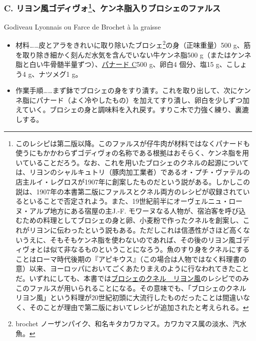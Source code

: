 \begin{recette}
{\subsubsection[C.
リヨン風ゴディヴォ、ケンネ脂入りブロシェのファルス]{\texorpdfstring{C.
リヨン風ゴディヴォ\footnote{このレシピは第二版以降。このファルスが仔牛肉が材料ではなくパナードも使うにもかかわらずゴディヴォの名称である根拠はおそらく、ケンネ脂を用いていることだろう。なお、これを用いたブロシェのクネルの起源については、リヨンのシャルキュトリ（豚肉加工業者）であるオ・プチ・ヴァテルの店主ルイ・レグロスが1907年に創案したものだという説がある。しかしこの説は、1907年の本書第二版にファルスとクネル両方のレシピが収録されているといることで否定されよう。また、19世紀前半にオーヴェルニュ・ローヌ・アルプ地方にある宿屋の主J.-F.
  モワーヌなる人物が、宿泊客を呼び込むための料理としてブロシェの身と卵、小麦粉で作ったクネルを創案し、これがリヨンに伝わったという説もある。ただしこれは信憑性がさほど高くないうえに、そもそもケンネ脂を使わないのであれば、その後のリヨン風ゴディヴォとは似て非なるものということになろう。魚のすり身をクネルにすることはローマ時代後期の『アピキウス』（この場合は人物ではなく料理書の意）以来、ヨーロッパにおいてごくあたりまえのように行なわれてきたことだ。いずれにしても、本書では\protect\hyperlink{quenelles-de-brochet-lyonnaise}{ブロシェのクネル　リヨン風}のレシピでのみこのファルスが用いられることになる。その意味でも、「ブロシェのクネル　リヨン風」という料理が20世紀初頭に大流行したものだったことは間違いなく、そのことが理由で第二版においてレシピが追加されたと考えられる。}、ケンネ脂入りブロシェのファルス}{C. リヨン風ゴディヴォ、ケンネ脂入りブロシェのファルス}}\label{godiveau-lyonnais}}

\begin{frsubenv}

Godiveau Lyonnais ou Farce de Brochet à la graisse

\end{frsubenv}


\begin{itemize}
\item
  材料\ldots{}\ldots{}皮とアラをきれいに取り除いたブロシェ\footnote{brochet
    ノーザンパイク、和名キタカワカマス。カワカマス属の淡水、汽水魚。}の身（正味重量）500
  g、筋を取り除き細かく刻んだ水気を含んでいない牛ケンネ脂500
  g（またはケンネ脂と白い牛骨髄半量ずつ）、\protect\hyperlink{panade-c}{パナード
  C}500 g、卵白4 個分、塩15 g、こしょう4 g、ナツメグ1 g。
\item
  作業手順\ldots{}\ldots{}まず鉢でブロシェの身をすり潰す。これを取り出して、次にケンネ脂にパナード（よく冷やしたもの）を加えてすり潰し、卵白を少しずつ加えていく。ブロシェの身と調味料を入れ戻す。すりこ木で力強く練り、裏漉しする。
\end{itemize}


\end{recette}
